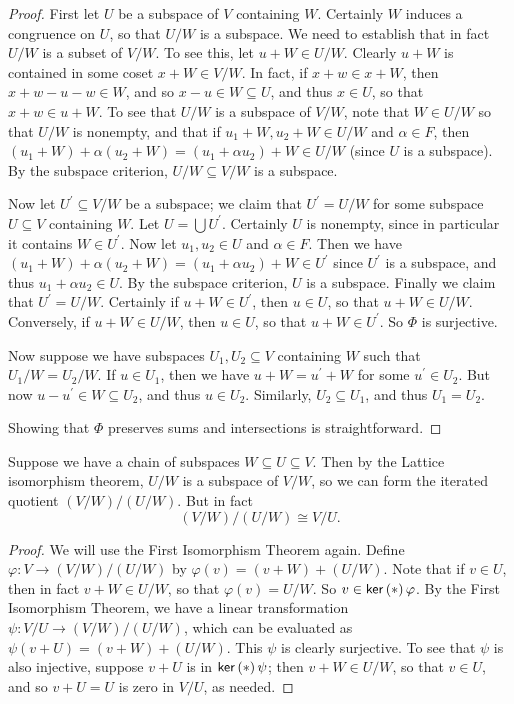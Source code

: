 \documentclass{memoir}
\begin{document}
\begin{proof}
First let $U$ be a subspace of $V$ containing $W$. Certainly $W$ induces a congruence on $U$, so that $U/W$ is a subspace. We need to establish that in fact $U/W$ is a subset of $V/W$. To see this, let $u+W \in U/W$. Clearly $u+W$ is contained in some coset $x+W \in V/W$. In fact, if $x+w \in x+W$, then $x+w-u-w \in W$, and so $x-u \in W \subseteq U$, and thus $x \in U$, so that $x+w \in u+W$. To see that $U/W$ is a subspace of $V/W$, note that $W \in U/W$ so that $U/W$ is nonempty, and that if $u_1+W, u_2+W \in U/W$ and $\alpha \in F$, then $(u_1+W)+\alpha(u_2+W) = (u_1 + \alpha u_2) + W \in U/W$ (since $U$ is a subspace). By the subspace criterion, $U/W \subseteq V/W$ is a subspace.

Now let $U^\prime \subseteq V/W$ be a subspace; we claim that $U^\prime = U/W$ for some subspace $U \subseteq V$ containing $W$. Let $U = \bigcup U^\prime$. Certainly $U$ is nonempty, since in particular it contains $W \in U^\prime$. Now let $u_1,u_2 \in U$ and $\alpha \in F$. Then we have $(u_1+W) + \alpha(u_2+W) = (u_1+\alpha u_2) + W \in U^\prime$ since $U^\prime$ is a subspace, and thus $u_1+\alpha u_2 \in U$. By the subspace criterion, $U$ is a subspace. Finally we claim that $U^\prime = U/W$. Certainly if $u+W \in U^\prime$, then $u \in U$, so that $u+W \in U/W$. Conversely, if $u+W \in U/W$, then $u \in U$, so that $u+W \in U^\prime$. So $\Phi$ is surjective.

Now suppose we have subspaces $U_1,U_2 \subseteq V$ containing $W$ such that $U_1/W = U_2/W$. If $u \in U_1$, then we have $u+W = u^\prime+W$ for some $u^\prime \in U_2$. But now $u - u^\prime \in W \subseteq U_2$, and thus $u \in U_2$. Similarly, $U_2 \subseteq U_1$, and thus $U_1 = U_2$.

Showing that $\Phi$ preserves sums and intersections is straightforward.
\end{proof}

\begin{prp}
Suppose we have a chain of subspaces $W \subseteq U \subseteq V$. Then by the Lattice isomorphism theorem, $U/W$ is a subspace of $V/W$, so we can form the iterated quotient $(V/W)/(U/W)$. But in fact \[ (V/W)/(U/W) \cong V/U. \]
\end{prp}

\begin{proof}
We will use the First Isomorphism Theorem again. Define $\varphi : V \rightarrow (V/W)/(U/W)$ by $\varphi(v) = (v+W)+(U/W)$. Note that if $v \in U$, then in fact $v+W \in U/W$, so that $\varphi(v) = U/W$. So $v \in \operatorname{\mathsf{ker}}\left(*\right){\varphi}$. By the First Isomorphism Theorem, we have a linear transformation $\psi : V/U \rightarrow (V/W)/(U/W)$, which can be evaluated as $\psi(v+U) = (v+W) + (U/W)$. This $\psi$ is clearly surjective. To see that $\psi$ is also injective, suppose $v+U$ is in $\operatorname{\mathsf{ker}}\left(*\right){\psi}$; then $v+W \in U/W$, so that $v \in U$, and so $v+U = U$ is zero in $V/U$, as needed.
\end{proof}
\end{document}
